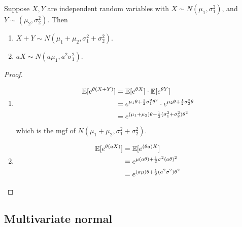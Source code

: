 %
\begin{note}
  \begin{field}
    \begin{thm}
      Suppose $X, Y$ are independent random variables with $X\sim N(\mu_1, \sigma_1^2)$, and $Y\sim (\mu_2, \sigma_2^2)$. Then
      \begin{enumerate}
        \item $X + Y \sim N(\mu_1 + \mu_2 , \sigma_1^2 + \sigma_2^2)$.
        \item $aX \sim N(a\mu_1, a^2 \sigma_1^2)$.
      \end{enumerate}
    \end{thm}
  \end{field}
  \begin{field}
    \begin{proof}\leavevmode
      \begin{enumerate}
        \item
          \begin{align*}
            \mathbb{E}[e^{\theta(X + Y)}] &= \mathbb{E}[e^{\theta X}] \cdot \mathbb{E}[e^{\theta Y}]\\
            &= e^{\mu_1 \theta + \frac{1}{2}\sigma_1^2\theta^2} \cdot e^{\mu_2 \theta + \frac{1}{2}\sigma_2^2 \theta}\\
            &= e^{(\mu_1 + \mu_2)\theta + \frac{1}{2}(\sigma_1^2 + \sigma_2^2)\theta^2}
          \end{align*}
          which is the mgf of $N(\mu_1 + \mu_2, \sigma_1^2 + \sigma_2^2)$.
        \item
          \begin{align*}
            \mathbb{E}[e^{\theta (aX)}] &= \mathbb{E}[e^{(\theta a)X}]\\
            &= e^{\mu(a\theta) + \frac{1}{2}\sigma^2 (a \theta)^2}\\
            &= e^{(a\mu)\theta + \frac{1}{2}(a^2\sigma^2)\theta^2}\qedhere
          \end{align*}%
      \end{enumerate}
    \end{proof}
  \end{field}
  \xplain{}%
\end{note}

\subsection{Multivariate normal}

